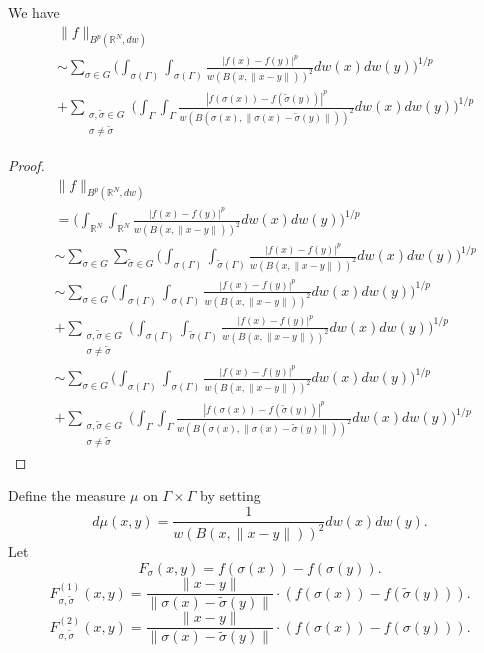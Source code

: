 \documentclass[12pt]{amsart}
\begin{document}
\begin{lemma}\label{lem2}
We have
\begin{align*}
&\|f\|_{B^p(\mathbb{R}^N,dw)}\\
&\sim\sum_{\sigma\in G}\Bigg({\int_{\sigma(\Gamma)}\int_{{\sigma}(\Gamma)}\frac{|f(x)-f(y)|^p}{w(B(x,\|x-y\|))^2}}dw(x)dw(y)\Bigg)^{1/p}\\
&+\sum_{\substack{\sigma,\tilde{\sigma}\in G\\ \sigma\neq \tilde{\sigma}}}\Bigg({\int_{\Gamma}\int_{\Gamma}\frac{|f(\sigma(x))-f(\tilde{\sigma}(y))|^p}{w(B(\sigma(x),\|\sigma(x)-\tilde{\sigma}(y)\|))^2}}dw(x)dw(y)\Bigg)^{1/p}
\end{align*}
\end{lemma}
\begin{proof}
\begin{align*}
&\|f\|_{B^p(\mathbb{R}^N,dw)}\\
&=\Bigg({\int_{\mathbb{R}^N}\int_{\mathbb{R}^N}\frac{|f(x)-f(y)|^p}{w(B(x,\|x-y\|))^2}}dw(x)dw(y)\Bigg)^{1/p}\\
&\sim\sum_{\sigma\in G}\sum_{\tilde{\sigma}\in G}\Bigg({\int_{\sigma(\Gamma)}\int_{\tilde{\sigma}(\Gamma)}\frac{|f(x)-f(y)|^p}{w(B(x,\|x-y\|))^2}}dw(x)dw(y)\Bigg)^{1/p}\\
&\sim\sum_{\sigma\in G}\Bigg({\int_{\sigma(\Gamma)}\int_{{\sigma}(\Gamma)}\frac{|f(x)-f(y)|^p}{w(B(x,\|x-y\|))^2}}dw(x)dw(y)\Bigg)^{1/p}\\
&+\sum_{\substack{\sigma,\tilde{\sigma}\in G\\ \sigma\neq \tilde{\sigma}}}\Bigg({\int_{\sigma(\Gamma)}\int_{\tilde{\sigma}(\Gamma)}\frac{|f(x)-f(y)|^p}{w(B(x,\|x-y\|))^2}}dw(x)dw(y)\Bigg)^{1/p}\\
&\sim\sum_{\sigma\in G}\Bigg({\int_{\sigma(\Gamma)}\int_{{\sigma}(\Gamma)}\frac{|f(x)-f(y)|^p}{w(B(x,\|x-y\|))^2}}dw(x)dw(y)\Bigg)^{1/p}\\
&+\sum_{\substack{\sigma,\tilde{\sigma}\in G\\ \sigma\neq \tilde{\sigma}}}\Bigg({\int_{\Gamma}\int_{\Gamma}\frac{|f(\sigma(x))-f(\tilde{\sigma}(y))|^p}{w(B(\sigma(x),\|\sigma(x)-\tilde{\sigma}(y)\|))^2}}dw(x)dw(y)\Bigg)^{1/p}
\end{align*}
\end{proof}
Define the measure $\mu$ on $\Gamma\times \Gamma$ by setting
$$d\mu(x,y)=\frac{1}{w(B(x,\|x-y\|))^2}dw(x)dw(y).$$
Let
$$F_{\sigma}(x,y)=f(\sigma(x))-f(\sigma(y)).$$
$$F_{\sigma,\tilde{\sigma}}^{(1)}(x,y)=\frac{\|x-y\|}{\|\sigma(x)-\tilde{\sigma}(y)\|}\cdot(f(\sigma(x))-f(\tilde{\sigma}(y))).$$
$$F_{\sigma,\tilde{\sigma}}^{(2)}(x,y)=\frac{\|x-y\|}{\|\sigma(x)-\tilde{\sigma}(y)\|}\cdot(f(\sigma(x))-f(\sigma(y))).$$
\end{document}
